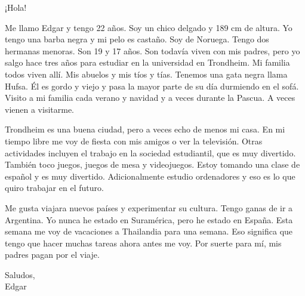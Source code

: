 \documentclass[a4paper]{article}
\date{}
\begin{document}
\thispagestyle{fancy}

¡Hola!

Me llamo Edgar y tengo 22 años. Soy un chico delgado y 189 cm de altura. Yo tengo una barba negra y mi pelo es castaño. Soy de Noruega. Tengo dos hermanas menoras. Son 19 y 17 años. Son todavía viven con mis padres, pero yo salgo hace tres años para estudiar en la universidad en Trondheim. Mi familia todos viven allí. Mis abuelos y mis tíos y tías. Tenemos una gata negra llama Hufsa. Él es gordo y viejo y pasa la mayor parte de su día durmiendo en el sofá. Visito a mi familia cada verano y navidad y a veces durante la Pascua. A veces vienen a visitarme.

Trondheim es una buena ciudad, pero a veces echo de menos mi casa. En mi tiempo libre me voy de fiesta con mis amigos o ver la televisión. Otras actividades incluyen el trabajo en la sociedad estudiantil, que es muy divertido. También toco juegos, juegos de mesa y videojuegos. Estoy tomando una clase de español y es muy divertido. Adicionalmente estudio ordenadores y eso es lo que quiro trabajar en el futuro.                                                          

\par

Me gusta viajara nuevos países y experimentar su cultura. Tengo ganas de ir a Argentina. Yo nunca he estado en Suramérica, pero he estado en España. Esta semana me voy de vacaciones a Thailandia para una semana. Eso significa que tengo que hacer muchas tareas ahora antes me voy. Por suerte para mí, mis padres pagan por el viaje. 

\par

Saludos,\\
Edgar
\end{document}
